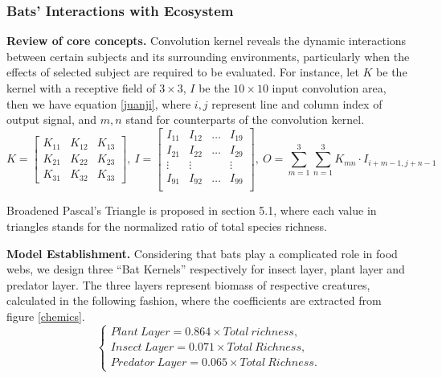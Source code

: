 \documentclass[12pt]{article}
\begin{document}
\subsubsection{Bats' Interactions with Ecosystem}
\hspace{2em}\textbf{Review of core concepts.} Convolution kernel reveals the dynamic interactions between certain subjects and its surrounding environments, particularly when the effects of selected subject are required to be evaluated. 
For instance, let $K$ be the kernel with a receptive field of $3\times 3$, $I$ be the $10\times 10$ input convolution area, then we have equation \ref{juanji}, where $i,j$ represent line and column index of output signal, and $m,n$ stand for counterparts of the convolution kernel.  
\begin{equation}
	K=\begin{bmatrix}
	K_{11} & K_{12} & K_{13} \\
	K_{21} & K_{22} & K_{23} \\
	K_{31} & K_{32} & K_{33} 
\end{bmatrix},\ I=\begin{bmatrix}
	I_{11} & I_{12} & \dots & I_{19} \\
	I_{21} & I_{22} & \dots & I_{29} \\
	\vdots & \vdots & 		& \vdots \\
	I_{91} & I_{92} & \dots & I_{99} \\
\end{bmatrix},\ O=\sum_{m=1}^{3}\sum_{n=1}^{3}K_{mn}\cdot I_{i+m-1,j+n-1}
\label{juanji}
\end{equation}


Broadened Pascal's Triangle is proposed in section 5.1, where each value in triangles stands for the normalized ratio of total species richness.

\textbf{Model Establishment. }Considering that bats play a complicated role in food webs, we design three ``Bat Kernels'' respectively for insect layer, plant layer and predator layer. The three layers represent biomass of respective creatures, calculated in the following fashion, where the coefficients are extracted from figure \ref{chemics}.
\begin{equation}
	\begin{cases}
Plant\ Layer = 0.864\times Total\ richness, \\ Insect\ Layer = 0.071\times Total\ Richness, \\ Predator\ Layer = 0.065\times  Total\ Richness.
	\end{cases}\label{ca}
\end{equation}
\end{document}
